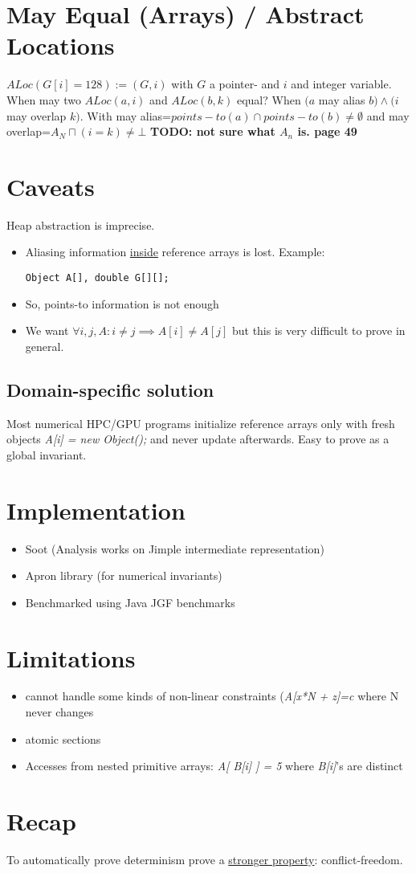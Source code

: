 \section{May Equal (Arrays) / Abstract Locations}
$ALoc(G[i]=128) := (G,i)$ with $G$ a pointer- and $i$ and integer variable. When may two $ALoc(a,i)$ and $ALoc(b,k)$ equal? When $(a $ may alias $ b) \wedge (i $ may overlap $ k)$. With may alias=$points-to(a) \cap points-to(b) \neq \emptyset$ and may overlap=$A_N \sqcap (i=k)\neq \bot$ \textbf{TODO: not sure what $A_n$ is. page 49}
\section{Caveats}
Heap abstraction is imprecise. 
\begin{itemize}
\item Aliasing information \underline{inside} reference arrays is lost. Example: \begin{verbatim}
Object A[], double G[][];
\end{verbatim}
\item So, points-to information is not enough
\item We want $\forall i,j,A:i \neq j \implies A[i] \neq A[j]$ but this is very difficult to prove in general.
\end{itemize}
\subsection{Domain-specific solution}
Most numerical HPC/GPU programs initialize reference arrays only with fresh objects \textit{A[i] = new Object();} and never update afterwards. Easy to prove as a global invariant.
\section{Implementation}
\begin{itemize}
\item Soot (Analysis works on Jimple intermediate representation)
\item Apron library (for numerical invariants)
\item Benchmarked using Java JGF benchmarks
\end{itemize}

\section{Limitations}
\begin{itemize}
\item cannot handle some kinds of non-linear constraints (\textit{A[x*N + z]=c} where N never changes
\item atomic sections
\item Accesses from nested primitive arrays: \textit{A[ B[i] ] = 5} where \textit{B[i]}'s are distinct
\end{itemize}
\section{Recap}
To automatically prove determinism prove a \underline{stronger property}: conflict-freedom.